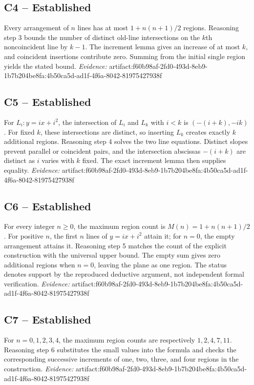 \documentclass[11pt]{article}
\begin{document}
\subsection{C4 -- Established}
Every arrangement of $n$ lines has at most $1+n(n+1)/2$ regions.
Reasoning step 3 bounds the number of distinct old-line intersections on the $k$th noncoincident line by $k-1$. The increment lemma gives an increase of at most $k$, and coincident insertions contribute zero. Summing from the initial single region yields the stated bound.
\textit{Evidence: }artifact:f60b98af-2fd0-493d-8eb9-1b7b204be8fa:4b50ca5d-ad1f-4f6a-8042-81975427938f
\subsection{C5 -- Established}
For $L_i: y=ix+i^2$, the intersection of $L_i$ and $L_k$ with $i<k$ is $(-(i+k),-ik)$. For fixed $k$, these intersections are distinct, so inserting $L_k$ creates exactly $k$ additional regions.
Reasoning step 4 solves the two line equations. Distinct slopes prevent parallel or coincident pairs, and the intersection abscissas $-(i+k)$ are distinct as $i$ varies with $k$ fixed. The exact increment lemma then supplies equality.
\textit{Evidence: }artifact:f60b98af-2fd0-493d-8eb9-1b7b204be8fa:4b50ca5d-ad1f-4f6a-8042-81975427938f
\subsection{C6 -- Established}
For every integer $n\geq 0$, the maximum region count is $M(n)=1+n(n+1)/2$. For positive $n$, the first $n$ lines of $y=ix+i^2$ attain it; for $n=0$, the empty arrangement attains it.
Reasoning step 5 matches the count of the explicit construction with the universal upper bound. The empty sum gives zero additional regions when $n=0$, leaving the plane as one region. The status denotes support by the reproduced deductive argument, not independent formal verification.
\textit{Evidence: }artifact:f60b98af-2fd0-493d-8eb9-1b7b204be8fa:4b50ca5d-ad1f-4f6a-8042-81975427938f
\subsection{C7 -- Established}
For $n=0,1,2,3,4$, the maximum region counts are respectively $1,2,4,7,11$.
Reasoning step 6 substitutes the small values into the formula and checks the corresponding successive increments of one, two, three, and four regions in the construction.
\textit{Evidence: }artifact:f60b98af-2fd0-493d-8eb9-1b7b204be8fa:4b50ca5d-ad1f-4f6a-8042-81975427938f
\end{document}
